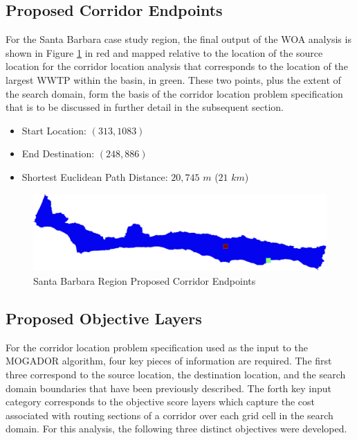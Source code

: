     \subsection{Proposed Corridor Endpoints}
    
For the Santa Barbara case study region, the final output of the WOA analysis is shown in Figure \ref{fig:SBendpoints} in red and mapped relative to the location of the source location for the corridor location analysis that corresponds to the location of the largest WWTP within the basin, in green. These two points, plus the extent of the search domain, form the basis of the corridor location problem specification that is to be discussed in further detail in the subsequent section. 
    
    \begin{itemize}
      \setlength{\itemsep}{0cm}
      \setlength{\parskip}{0cm}
        \item Start Location: $(313,1083)$
        \item End Destination: $(248,886)$   
        \item Shortest Euclidean Path Distance: $20,745$ $m$ ($21$ $km$) 
    \end{itemize}
    
        \begin{figure}[!h]
            \begin{center}
            \includegraphics[width=5.5in]{figures/SantaBarbara_Endpoints.png}   
            \caption{Santa Barbara Region Proposed Corridor Endpoints}
            \label{fig:SBendpoints}
            \end{center}
        \end{figure}
            
    \subsection{Proposed Objective Layers}
    
For the corridor location problem specification used as the input to the MOGADOR algorithm, four key pieces of information are required. The first three correspond to the source location, the destination location, and the search domain boundaries that have been previously described. The forth key input category corresponds to the objective score layers which capture the cost associated with routing sections of a corridor over each grid cell in the search domain. For this analysis, the following three distinct objectives were developed.

